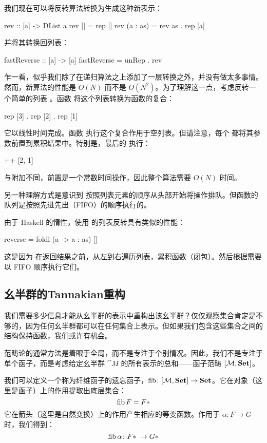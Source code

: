\documentclass[DaoFP]{subfiles}
\begin{document}
我们现在可以将反转算法转换为生成这种新表示：
\begin{haskell}
rev :: [a] -> DList a
rev [] = rep []
rev (a : as) = rev as . rep [a]
\end{haskell}
并将其转换回列表：
\begin{haskell}
fastReverse :: [a] -> [a]
fastReverse = unRep . rev
\end{haskell}
乍一看，似乎我们除了在递归算法之上添加了一层转换之外，并没有做太多事情。然而，新算法的性能是 $O(N)$ 而不是 $O(N^2)$。为了理解这一点，考虑反转一个简单的列表 \hask{[1, 2, 3]}。函数  将这个列表转换为函数的复合：
\begin{haskell}
 rep [3] . rep [2] . rep [1]
\end{haskell}
它以线性时间完成。函数  执行这个复合作用于空列表。但请注意，每个  都将其参数前置到累积结果中。特别是，最后的  执行：
\begin{haskell}
 [3] ++ [2, 1]
\end{haskell}
与附加不同，前置是一个常数时间操作，因此整个算法需要 $O(N)$ 时间。

另一种理解方式是意识到  按照列表元素的顺序从头部开始将操作排队。但函数的队列是按照先进先出（FIFO）的顺序执行的。

由于 Haskell 的惰性，使用  的列表反转具有类似的性能：
\begin{haskell}
reverse = foldl (\as a -> a : as) []
\end{haskell}
这是因为  在返回结果之前，从左到右遍历列表，累积函数（闭包）。然后根据需要以 FIFO 顺序执行它们。

\subsection{幺半群的Tannakian重构}

我们需要多少信息才能从幺半群的表示中重构出该幺半群？仅仅观察集合肯定是不够的，因为任何幺半群都可以在任何集合上表示。但如果我们包含这些集合之间的结构保持函数，我们或许有机会。

范畴论的通常方法是着眼于全局，而不是专注于个别情况。因此，我们不是专注于单个函子，而是考虑给定幺半群 $\cat M$ 的所有表示的总和——函子范畴 $[\mathcal{M}, \mathbf{Set}]$。

我们可以定义一个称为纤维函子的遗忘函子，$\mathop{\text{fib}} \colon [\mathcal{M}, \mathbf{Set}] \to \mathbf{Set}$。它在对象（这里是函子）上的作用提取出底层集合：
\[ \mathop{\text{fib}} F = F *\]
它在箭头（这里是自然变换）上的作用产生相应的等变函数。作用于 $\alpha \colon F \to G$ 时，我们得到：
\[\mathop{\mathop{\text{fib}}} \alpha \colon F *\; \to G * \]
\end{document}
